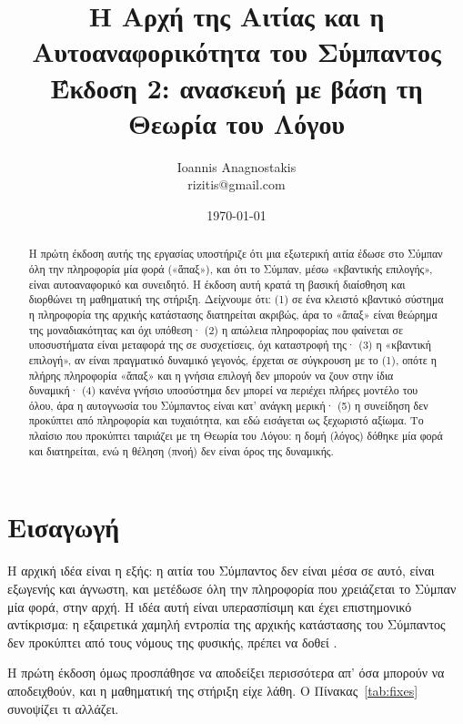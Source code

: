 \documentclass[a4paper,11pt]{article}
\title{Η Αρχή της Αιτίας και η Αυτοαναφορικότητα του Σύμπαντος\\[4pt]
\large Έκδοση 2: ανασκευή με βάση τη Θεωρία του Λόγου}
\author{Ioannis Anagnostakis \\ rizitis@gmail.com}
\date{\today}
\theoremstyle{definition}
\begin{document}
\maketitle

\begin{abstract}
Η πρώτη έκδοση αυτής της εργασίας υποστήριζε ότι μια εξωτερική αιτία έδωσε στο Σύμπαν όλη την πληροφορία μία φορά («ἅπαξ»), και ότι το Σύμπαν, μέσω «κβαντικής επιλογής», είναι αυτοαναφορικό και συνειδητό. Η έκδοση αυτή κρατά τη βασική διαίσθηση και διορθώνει τη μαθηματική της στήριξη. Δείχνουμε ότι: (1) σε ένα κλειστό κβαντικό σύστημα η πληροφορία της αρχικής κατάστασης διατηρείται ακριβώς, άρα το «ἅπαξ» είναι θεώρημα της μοναδιακότητας και όχι υπόθεση· (2) η απώλεια πληροφορίας που φαίνεται σε υποσυστήματα είναι μεταφορά της σε συσχετίσεις, όχι καταστροφή της· (3) η «κβαντική επιλογή», αν είναι πραγματικό δυναμικό γεγονός, έρχεται σε σύγκρουση με το (1), οπότε η πλήρης πληροφορία «ἅπαξ» και η γνήσια επιλογή δεν μπορούν να ζουν στην ίδια δυναμική· (4) κανένα γνήσιο υποσύστημα δεν μπορεί να περιέχει πλήρες μοντέλο του όλου, άρα η αυτογνωσία του Σύμπαντος είναι κατ' ανάγκη μερική· (5) η συνείδηση δεν προκύπτει από πληροφορία και τυχαιότητα, και εδώ εισάγεται ως ξεχωριστό αξίωμα. Το πλαίσιο που προκύπτει ταιριάζει με τη Θεωρία του Λόγου: η δομή (λόγος) δόθηκε μία φορά και διατηρείται, ενώ η θέληση (πνοή) δεν είναι όρος της δυναμικής.
\end{abstract}

\section{Εισαγωγή}

Η αρχική ιδέα είναι η εξής: η αιτία του Σύμπαντος δεν είναι μέσα σε αυτό, είναι εξωγενής και άγνωστη, και μετέδωσε όλη την πληροφορία που χρειάζεται το Σύμπαν μία φορά, στην αρχή. Η ιδέα αυτή είναι υπερασπίσιμη και έχει επιστημονικό αντίκρισμα: η εξαιρετικά χαμηλή εντροπία της αρχικής κατάστασης του Σύμπαντος δεν προκύπτει από τους νόμους της φυσικής, πρέπει να δοθεί \cite{penrose}.

Η πρώτη έκδοση όμως προσπάθησε να αποδείξει περισσότερα απ' όσα μπορούν να αποδειχθούν, και η μαθηματική της στήριξη είχε λάθη. Ο Πίνακας~\ref{tab:fixes} συνοψίζει τι αλλάζει.
\end{document}
